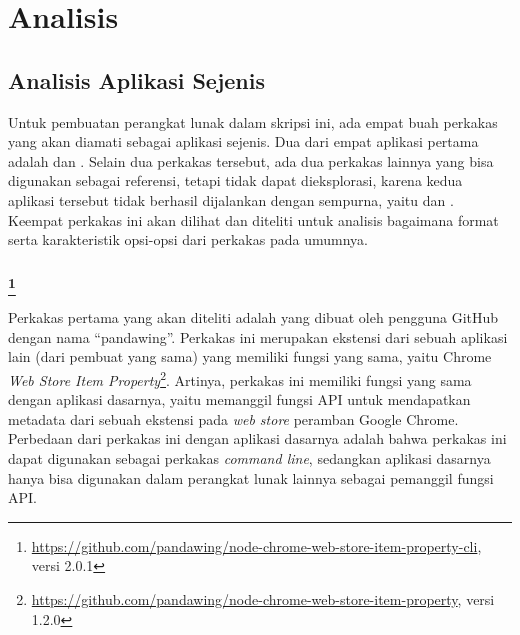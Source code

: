 \chapter{Analisis}
\label{chap:analysis}
\vspace{-1em} %
\section{Analisis Aplikasi Sejenis}
\label{sec:analysis-similarapps}

Untuk pembuatan perangkat lunak dalam skripsi ini, ada empat buah perkakas \cl\xspace yang akan diamati sebagai aplikasi sejenis. Dua dari empat aplikasi pertama adalah \chromewebstorecli\xspace dan \itunesapi. Selain dua perkakas tersebut, ada dua perkakas lainnya yang bisa digunakan sebagai referensi, tetapi tidak dapat dieksplorasi, karena kedua aplikasi tersebut tidak berhasil dijalankan dengan sempurna, yaitu \ubercli\xspace dan \googlemapscli. Keempat perkakas ini akan dilihat dan diteliti untuk analisis bagaimana format serta karakteristik opsi-opsi dari perkakas \cl\xspace pada umumnya.
\vspace{-0.15em} %
\subsection[\chromewebstorecli]{\chromewebstorecli\footnote{\href{https://github.com/pandawing/node-chrome-web-store-item-property-cli}{https://github.com/pandawing/node-chrome-web-store-item-property-cli}, versi 2.0.1}}
\label{sec:similarapps-chromewebstore}

Perkakas pertama yang akan diteliti adalah \chromewebstorecli\xspace yang dibuat oleh pengguna GitHub dengan nama ``pandawing''. Perkakas ini merupakan ekstensi dari sebuah aplikasi lain (dari pembuat yang sama) yang memiliki fungsi yang sama, yaitu Chrome \textit{Web Store Item Property}\footnote{\href{https://github.com/pandawing/node-chrome-web-store-item-property}{https://github.com/pandawing/node-chrome-web-store-item-property}, versi 1.2.0}. Artinya, perkakas ini memiliki fungsi yang sama dengan aplikasi dasarnya, yaitu memanggil fungsi API untuk mendapatkan metadata dari sebuah ekstensi pada \textit{web store} peramban Google Chrome. Perbedaan dari perkakas ini dengan aplikasi dasarnya adalah bahwa perkakas ini dapat digunakan sebagai perkakas \textit{command line}, sedangkan aplikasi dasarnya hanya bisa digunakan dalam perangkat lunak lainnya sebagai pemanggil fungsi API.
\vspace{-0.15em} %
